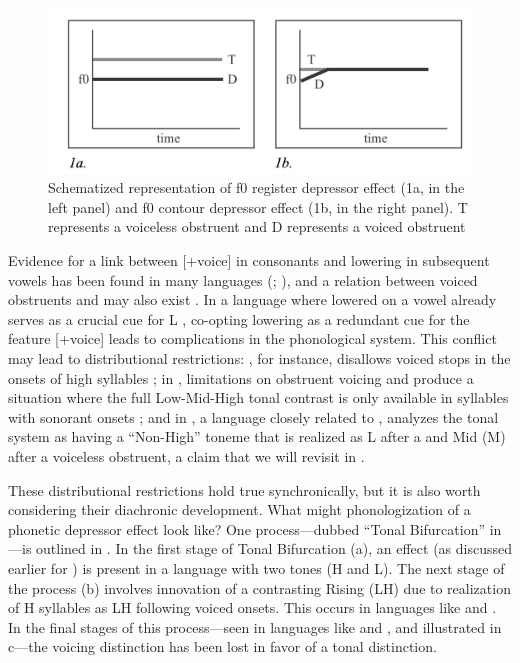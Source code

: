 \documentclass[output=paper
,newtxmath
,modfonts
,nonflat]{langsci/langscibook}
\begin{document}
\begin{figure} 
\includegraphics[width=\textwidth]{figures/fig-lotven-1.png}  

\caption{\label{fig:lotven:samson:1} Schematized representation of f0 register depressor effect (1a, in the left panel) and f0 contour depressor effect (1b, in the right panel). T represents a voiceless obstruent and D represents a voiced obstruent}
\end{figure}


Evidence for a link between [+voice] in consonants and  lowering in subsequent vowels has been found in many languages (\citealt{Bradshaw1999}; \citealt{Tang2008}), and a relation between voiced obstruents and  may also exist \citep[5]{Yip2002}. In a  language where lowered  on a vowel already serves as a crucial cue for L , co-opting  lowering as a redundant cue for the feature [+voice] leads to complications in the phonological system. This conflict may lead to distributional restrictions: , for instance, disallows voiced stops in the onsets of high  syllables \citep{perkins2011}; in , limitations on obstruent voicing and  produce a situation where the full Low-Mid-High tonal contrast is only available in syllables with sonorant onsets \citep{Pearce2005}; and in , a language closely related to , \citet{Ansre1961} analyzes the tonal system as having a “Non-High” toneme that is realized as L after a  and Mid (M) after a voiceless obstruent, a claim that we will revisit in . 

These distributional restrictions hold true synchronically, but it is also worth considering their diachronic development. What might phonologization of a phonetic depressor effect look like? One process—dubbed “Tonal Bifurcation” in \citet{Hyman2013enlarging}—is outlined in . In the first stage of Tonal Bifurcation (a), an  effect (as discussed earlier for ) is present in a language with two  tones (H and L). The next stage of the process (b) involves innovation of a contrasting Rising (LH)  due to realization of H  syllables as LH following voiced onsets. This occurs in languages like  and  \citep{Ansre1961,Bole-Richard1983}. In the final stages of this process—seen in languages like  and  \citep{Downing2009}, and illustrated in c—the voicing distinction has been lost in favor of a tonal distinction.
\end{document}
